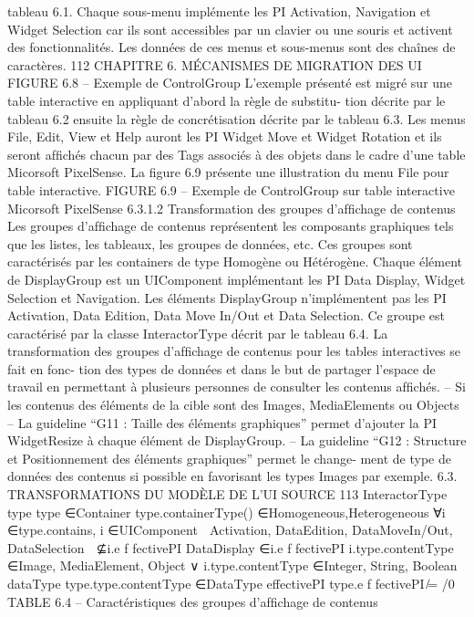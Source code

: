 \documentclass{article}
\begin{document}
tableau 6.1. Chaque sous-menu implémente les PI Activation, Navigation et Widget Selection car ils
sont accessibles par un clavier ou une souris et activent des fonctionnalités. Les données de ces menus
et sous-menus sont des chaînes de caractères.
112
CHAPITRE 6. MÉCANISMES DE MIGRATION DES UI
FIGURE 6.8 – Exemple de ControlGroup
L’exemple présenté est migré sur une table interactive en appliquant d’abord la règle de substitu-
tion décrite par le tableau 6.2 ensuite la règle de concrétisation décrite par le tableau 6.3. Les menus
File, Edit, View et Help auront les PI Widget Move et Widget Rotation et ils seront afﬁchés chacun par
des Tags associés à des objets dans le cadre d’une table Micorsoft PixelSense. La ﬁgure 6.9 présente
une illustration du menu File pour table interactive.
FIGURE 6.9 – Exemple de ControlGroup sur table interactive Micorsoft PixelSense
6.3.1.2
Transformation des groupes d’afﬁchage de contenus
Les groupes d’afﬁchage de contenus représentent les composants graphiques tels que les listes,
les tableaux, les groupes de données, etc. Ces groupes sont caractérisés par les containers de type
Homogène ou Hétérogène. Chaque élément de DisplayGroup est un UIComponent implémentant les
PI Data Display, Widget Selection et Navigation. Les éléments DisplayGroup n’implémentent pas les
PI Activation, Data Edition, Data Move In/Out et Data Selection. Ce groupe est caractérisé par la
classe InteractorType décrit par le tableau 6.4.
La transformation des groupes d’afﬁchage de contenus pour les tables interactives se fait en fonc-
tion des types de données et dans le but de partager l’espace de travail en permettant à plusieurs
personnes de consulter les contenus afﬁchés.
– Si les contenus des éléments de la cible sont des Images, MediaElements ou Objects
– La guideline “G11 : Taille des éléments graphiques” permet d’ajouter la PI WidgetResize à
chaque élément de DisplayGroup.
– La guideline “G12 : Structure et Positionnement des éléments graphiques” permet le change-
ment de type de données des contenus si possible en favorisant les types Images par exemple.
6.3. TRANSFORMATIONS DU MODÈLE DE L’UI SOURCE
113
InteractorType
type
type ∈{Container}
type.containerType() ∈{Homogeneous,Heterogeneous}
∀i ∈type.contains, i ∈{UIComponent}

Activation, DataEdition,
DataMoveIn/Out, DataSelection

⊈i.e f fectivePI
DataDisplay ∈i.e f fectivePI
i.type.contentType ∈{Image, MediaElement, Object}
∨
i.type.contentType ∈{Integer, String, Boolean}
dataType
type.type.contentType ∈DataType
effectivePI
type.e f fectivePI ̸= /0
TABLE 6.4 – Caractéristiques des groupes d’afﬁchage de contenus
\end{document}
